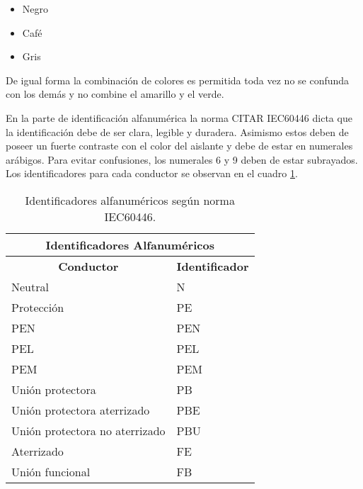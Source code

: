   \begin{itemize}
  \item Negro
  \item Café
  \item Gris
  \end{itemize}
  
  De igual forma la combinación de colores es permitida toda vez no se confunda con los demás y no combine el amarillo y el verde.
  
  En la parte de identificación alfanumérica la norma CITAR IEC60446 dicta que la identificación debe de ser clara, legible y duradera. Asimismo estos deben de poseer un fuerte contraste con el color del aislante y debe de estar en numerales arábigos. Para evitar confusiones, los numerales 6 y 9 deben de estar subrayados. Los identificadores para cada conductor se observan en el cuadro \ref{cuadro:IdentificadoresA}.
  
  \begin{table}[h]
  \centering
\begin{tabular}{|l|l|}
\hline
\multicolumn{2}{|c|}{\textbf{Identificadores Alfanuméricos}}                           \\ \hline
\multicolumn{1}{|c|}{\textbf{Conductor}} & \multicolumn{1}{c|}{\textbf{Identificador}} \\ \hline
Neutral                                  & N                                           \\ \hline
Protección                               & PE                                          \\ \hline
PEN                                      & PEN                                         \\ \hline
PEL                                      & PEL                                         \\ \hline
PEM                                      & PEM                                         \\ \hline
Unión protectora                         & PB                                          \\ \hline
Unión protectora aterrizado              & PBE                                         \\ \hline
Unión protectora no aterrizado           & PBU                                         \\ \hline
Aterrizado                               & FE                                          \\ \hline
Unión funcional                          & FB                                          \\ \hline
\end{tabular}
\caption{Identificadores alfanuméricos según norma IEC60446.}
\label{cuadro:IdentificadoresA}
\end{table}


